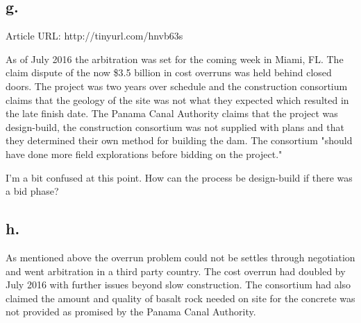 \documentclass[12pt]{article}
\renewcommand{\=}[1]{\stackrel{#1}{=}} %
\theoremstyle{definition}
\theoremstyle{remark}
\begin{document}
\subsection{g.}
Article URL: {\small http://tinyurl.com/hnvb63s}\vspace{1em}


As of July 2016 the arbitration was set for the coming week in Miami, FL. The claim dispute of the now \$3.5 billion in cost overruns was held behind closed doors. The project was two years over schedule and the construction consortium claims that the geology of the site was not what they expected which resulted in the late finish date. The Panama Canal Authority claims that the project was design-build, the construction consortium was not supplied with plans and that they determined their own method for building the dam. The consortium "should have done more field explorations before bidding on the project."
\vspace{1em}

\noindent I'm a bit confused at this point. How can the process be design-build if there was a bid phase?

\subsection{h.}
As mentioned above the overrun problem could not be settles through negotiation and went arbitration in a third party country. The cost overrun had doubled by July 2016 with further issues beyond slow construction. The consortium had also claimed the amount and quality of basalt rock needed on site for the concrete was not provided as promised by the Panama Canal Authority.
\end{document}
